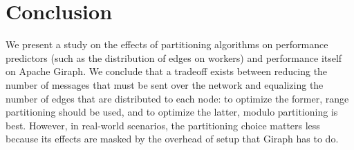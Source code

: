 \section{Conclusion}
\label{sec:conclusion}

We present a study on the effects of partitioning algorithms on 
performance predictors (such as the distribution of edges on workers) and 
performance itself on Apache Giraph. We conclude that a tradeoff exists between 
reducing the number of messages that must be sent over the network and 
equalizing the number of edges that are distributed to each node: to optimize 
the former, range partitioning should be used, and to optimize the latter, 
modulo partitioning is best. However, in real-world scenarios, the partitioning 
choice matters less because its effects are masked by the overhead of setup 
that Giraph has to do.